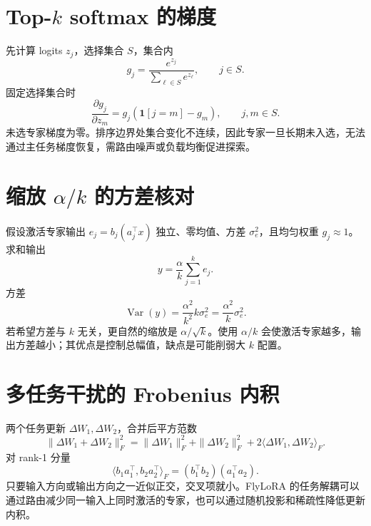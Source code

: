 \documentclass[UTF8,12pt,a4paper,fontset=none]{ctexart}
\numberwithin{equation}{section}
\begin{document}
\section{Top-$k$ softmax 的梯度}
先计算 logits $z_j$，选择集合 $S$，集合内
\begin{equation}
 g_j=\frac{e^{z_j}}{\sum_{\ell\in S}e^{z_\ell}},\qquad j\in S.
\end{equation}
固定选择集合时
\begin{equation}
 \frac{\partial g_j}{\partial z_m}
 =g_j(\mathbf 1[j=m]-g_m),\qquad j,m\in S.
\end{equation}
未选专家梯度为零。排序边界处集合变化不连续，因此专家一旦长期未入选，无法通过主任务梯度恢复，需路由噪声或负载均衡促进探索。

\section{缩放 $\alpha/k$ 的方差核对}
假设激活专家输出 $e_j=b_j(a_j^\top x)$ 独立、零均值、方差 $\sigma_e^2$，且均匀权重 $g_j\approx1$。求和输出
\begin{equation}
 y=\frac{\alpha}{k}\sum_{j=1}^{k}e_j.
\end{equation}
方差
\begin{equation}
 \operatorname{Var}(y)=
 \frac{\alpha^2}{k^2}k\sigma_e^2
 =\frac{\alpha^2}{k}\sigma_e^2.
\end{equation}
若希望方差与 $k$ 无关，更自然的缩放是 $\alpha/\sqrt{k}$。使用 $\alpha/k$ 会使激活专家越多，输出方差越小；其优点是控制总幅值，缺点是可能削弱大 $k$ 配置。

\section{多任务干扰的 Frobenius 内积}
两个任务更新 $\Delta W_1,\Delta W_2$，合并后平方范数
\begin{equation}
 \|\Delta W_1+\Delta W_2\|_F^2
 =\|\Delta W_1\|_F^2+
 \|\Delta W_2\|_F^2+
 2\langle\Delta W_1,\Delta W_2\rangle_F.
\end{equation}
对 rank-1 分量
\begin{equation}
 \langle b_1a_1^\top,b_2a_2^\top\rangle_F
 =(b_1^\top b_2)(a_1^\top a_2).
\end{equation}
只要输入方向或输出方向之一近似正交，交叉项就小。FlyLoRA 的任务解耦可以通过路由减少同一输入上同时激活的专家，也可以通过随机投影和稀疏性降低更新内积。
\end{document}
